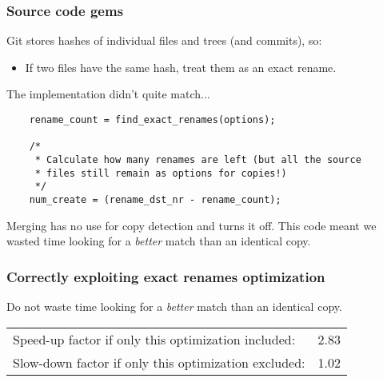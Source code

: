 \documentclass[compress,t]{beamer}
\begin{document}

\begin{frame}[fragile]
  \frametitle{Source code gems}

  Git stores hashes of individual files and trees (and commits), so:
  \begin{itemize}
    \item If two files have the same hash, treat them as an exact rename.
  \end{itemize}

  \pause
  \vspace*{1.0\baselineskip}
  The implementation didn't quite match...\\
  \vspace*{0.5\baselineskip}
  \qquad
  \begin{minipage}{0.8\textwidth}
  {\footnotesize
  \begin{verbatim}
	rename_count = find_exact_renames(options);

	/*
	 * Calculate how many renames are left (but all the source
	 * files still remain as options for copies!)
	 */
	num_create = (rename_dst_nr - rename_count);
  \end{verbatim}
  }
  \end{minipage}

  \pause
  \vspace*{1.0\baselineskip}
  Merging has no use for copy detection and turns it off.
  \pause
  This code meant we wasted time looking for a \textit{better} match than
  an identical copy.

\end{frame}


\begin{frame}
  \frametitle{Correctly exploiting exact renames optimization}

  Do not waste time looking for a \textit{better} match than an
  identical copy.

  \pause
  \vspace*{\baselineskip}
  \begin{tabular}{lr}
    Speed-up factor if only this optimization included:  & 2.83 \\
    Slow-down factor if only this optimization excluded: & 1.02
  \end{tabular}

\end{frame}
\end{document}
